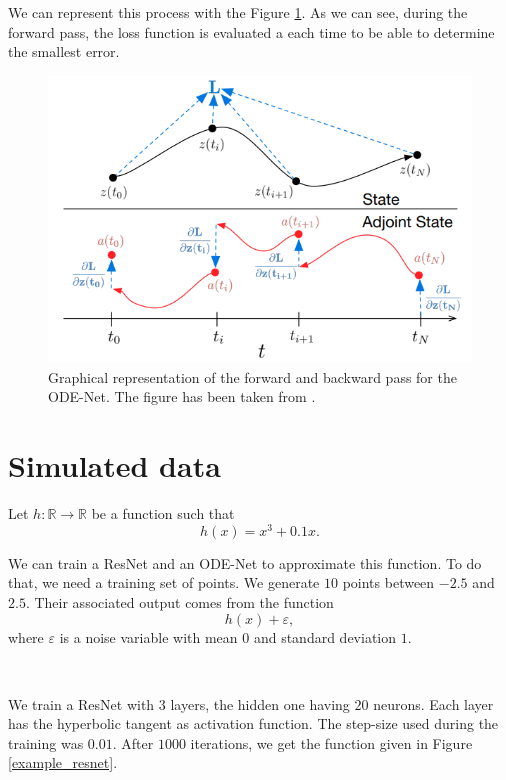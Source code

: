 \documentclass[10pt,a4paper]{article}
\theoremstyle{definition}
\theoremstyle{plain}
\begin{document}
We can represent this process with the Figure \ref{process}. As we can see, during the forward pass, the loss function is evaluated a each time to be able to determine the smallest error.
\begin{figure}[!h]
\center
\includegraphics[scale=0.7]{fig2.png}
\caption{Graphical representation of the forward and backward pass for the ODE-Net. The figure has been taken from \cite{12}.}
\label{process}
\end{figure}

\section{Simulated data}

Let $h: \mathbb{R} \to \mathbb{R}$ be a function such that
$$
h(x) = x^3 + 0.1x.
$$

We can train a ResNet and an ODE-Net to approximate this function.
To do that, we need a training set of points. We generate $10$ points between $-2.5$ and $2.5$. Their associated output comes from the function
$$
h(x) + \varepsilon,
$$
where $\varepsilon$ is a noise variable with mean $0$ and standard deviation $1$.

~

We train a ResNet with $3$ layers, the hidden one having $20$ neurons. Each layer has the hyperbolic tangent as activation function. The step-size used during the training was $0.01$. After $1000$ iterations, we get the function given in Figure \ref{example_resnet}.
\end{document}
